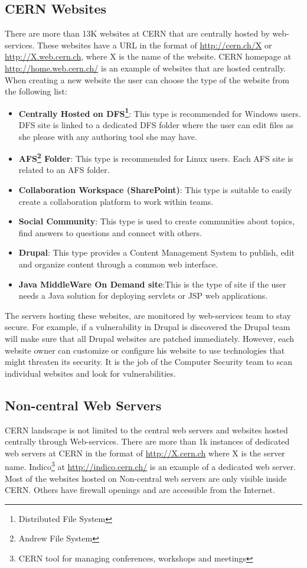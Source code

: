 \subsection{CERN Websites}
There are more than 13K websites at CERN that are centrally hosted by web-services. These websites have a URL in the format of \url{http://cern.ch/X} or \url{http://X.web.cern.ch}, where X is the name of the website. CERN homepage at \url{http://home.web.cern.ch/} is an example of websites that are hosted centrally. When creating a new website the user can choose the type of the website from the following list:
\begin{itemize}
\item \textbf{Centrally Hosted on DFS\footnote{Distributed File System}}: This type is recommended for Windows users. DFS site is linked to a dedicated DFS folder where the user can edit files as she please with any authoring tool she may have.
\item \textbf{AFS\footnote{Andrew File System} Folder}: This type is recommended for Linux users. Each AFS site is related to an AFS folder.
\item \textbf{Collaboration Workspace (SharePoint)}: This type is suitable to easily create a collaboration platform to work within teams.
\item \textbf{Social Community}: This type is used to create communities about topics, find answers to questions and connect with others.
\item \textbf{Drupal}: This type provides a Content Management System to publish, edit and organize content through a common web interface.
\item \textbf{Java MiddleWare On Demand site}:This is the type of site if the user needs a Java solution for deploying servlets or JSP web applications.
\end{itemize}
The servers hosting these websites, are monitored by web-services team to stay secure. For example, if a vulnerability in Drupal is discovered the Drupal team will make sure that all Drupal websites are patched immediately. However, each website owner can customize or configure his website to use technologies that might threaten its security. It is the job of the Computer Security team to scan individual websites and look for vulnerabilities. 
\subsection{Non-central Web Servers}
CERN landscape is not limited to the central web servers and websites hosted centrally through Web-services. There are more than 1k instances of dedicated web servers at CERN in the format of \url{http://X.cern.ch} where X is the server name. Indico\footnote{CERN tool for managing conferences, workshops and meetings} at \url{http://indico.cern.ch/} is an example of a dedicated web server. Most of the websites hosted on Non-central web servers are only visible inside CERN. Others have firewall openings and are accessible from the Internet.

